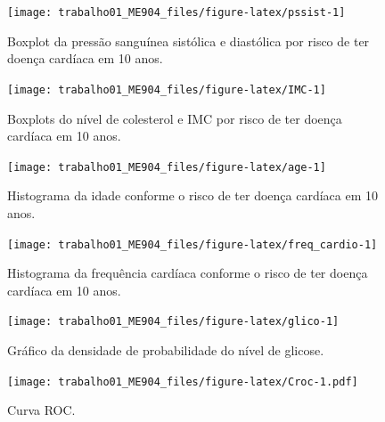 \documentclass[
  12pt,
]{article}
\begin{document}
\begin{figure}

{\centering \texttt{[image: trabalho01\_ME904\_files/figure-latex/pssist-1]} 

}

\caption{Boxplot da pressão sanguínea sistólica e diastólica por risco de ter doença cardíaca em 10 anos.}\label{fig:pssist}
\end{figure}

\begin{figure}

{\centering \texttt{[image: trabalho01\_ME904\_files/figure-latex/IMC-1]} 

}

\caption{Boxplots do nível de colesterol e IMC por risco de ter doença cardíaca em 10 anos.}\label{fig:IMC}
\end{figure}

\begin{figure}

{\centering \texttt{[image: trabalho01\_ME904\_files/figure-latex/age-1]} 

}

\caption{Histograma da idade conforme o risco de ter doença cardíaca em 10 anos.}\label{fig:age}
\end{figure}

\begin{figure}

{\centering \texttt{[image: trabalho01\_ME904\_files/figure-latex/freq\_cardio-1]} 

}

\caption{Histograma da frequência cardíaca conforme o risco de ter doença cardíaca em 10 anos.}\label{fig:freq_cardio}
\end{figure}

\begin{figure}

{\centering \texttt{[image: trabalho01\_ME904\_files/figure-latex/glico-1]} 

}

\caption{Gráfico da densidade de probabilidade do nível de glicose.}\label{fig:glico}
\end{figure}

\begin{figure}
\centering
\texttt{[image: trabalho01\_ME904\_files/figure-latex/Croc-1.pdf]}
\caption{Curva ROC.}
\end{figure}
\end{document}
